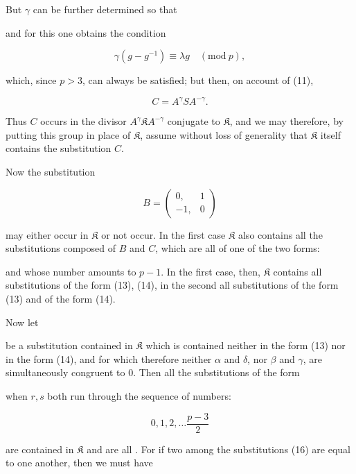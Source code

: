 
But $\gamma$ can be further determined so that


and for this one obtains the condition

\[ \gamma(g-g^{-1})\equiv\lambda g\quad(\mathrm{mod}\ p), \]

which, since $p>3$, can always be satisfied; but then, on account of (11),

\[ C=A^{\gamma}SA^{-\gamma}. \]

Thus $C$ occurs in the divisor $A^{\gamma}\mathfrak{K} A^{-\gamma}$ conjugate to $\mathfrak{K}$, and we may therefore, by putting this group in place of $\mathfrak{K}$, assume without loss of generality that $\mathfrak{K}$ itself contains the substitution $C$.

Now the substitution

\[ B=\begin{pmatrix}0, & 1\\ -1, & 0\end{pmatrix} \]

may either occur in $\mathfrak{K}$ or not occur. In the first case $\mathfrak{K}$ also contains all the substitutions composed of $B$ and $C$, which are all of one of the two forms:



and whose number amounts to $p-1$. In the first case, then, $\mathfrak{K}$ contains all substitutions of the form (13), (14), in the second all substitutions of the form (13) and  of the form (14).

Now let


be a substitution contained in $\mathfrak{K}$ which is contained neither in the form (13) nor in the form (14), and for which therefore neither $\alpha$ and $\delta$, nor $\beta$ and $\gamma$, are simultaneously congruent to $0$. Then all the substitutions of the form


when $r,s$ both run through the sequence of numbers:

\[ 0,1,2,\dots\frac{p-3}{2} \]

are contained in $\mathfrak{K}$ and are all . For if two among the substitutions (16) are equal to one another, then we must have
